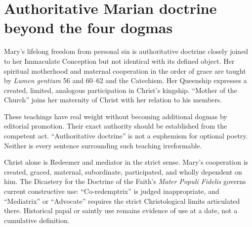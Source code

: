 \section{Authoritative Marian doctrine beyond the four dogmas}

Mary's lifelong freedom from personal sin is authoritative doctrine closely
joined to her Immaculate Conception but not identical with its defined object.
Her spiritual motherhood and maternal cooperation in the order of grace are
taught by \emph{Lumen gentium} 56 and 60--62 and the Catechism. Her Queenship
expresses a created, limited, analogous participation in Christ's kingship.
``Mother of the Church'' joins her maternity of Christ with her relation to
his members.

These teachings have real weight without becoming additional dogmas by
editorial promotion. Their exact authority should be established from the
competent act. ``Authoritative doctrine'' is not a euphemism for optional
poetry. Neither is every sentence surrounding such teaching irreformable.

Christ alone is Redeemer and mediator in the strict sense. Mary's cooperation
is created, graced, maternal, subordinate, participated, and wholly dependent
on him. The Dicastery for the Doctrine of the Faith's \emph{Mater Populi
Fidelis} governs current constructive use: ``Co-redemptrix'' is judged
inappropriate, and ``Mediatrix'' or ``Advocate'' requires the strict
Christological limits articulated there. Historical papal or saintly use
remains evidence of use at a date, not a cumulative definition.

